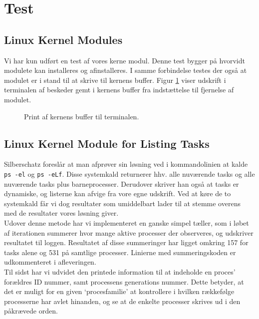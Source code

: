 \documentclass[main.tex]{subfile}
\begin{document}
\section{Test}
\subsection{Linux Kernel Modules}
Vi har kun udført en test af vores kerne modul. Denne test bygger på hvorvidt modulete kan installeres og afinstalleres. I samme forbindelse testes der også at modulet er i stand til at skrive til kernens buffer. Figur \ref{fig:part1_dmesg} viser udskrift i terminalen af beskeder gemt i kernens buffer fra indstættelse til fjernelse af modulet.
\begin{figure}[H]
\center
{}
\caption{Print af kernens buffer til terminalen.}
\label{fig:part1_dmesg}
\end{figure}

\subsection{Linux Kernel Module for Listing Tasks}
Silberschatz foreslår at man afprøver sin løsning ved i kommandolinien at kalde \texttt{ps -el} og \texttt{ps -eLf}. Disse systemkald returnerer hhv. alle nuværende tasks og alle nuværende tasks plus barneprocesser. Derudover skriver han også at tasks er dynamiske, og listerne kan afvige fra vore egne udskrift. Ved at køre de to systemkald får vi dog resultater som umiddelbart lader til at stemme overens med de resultater vores løsning giver.\\

Udover denne metode har vi implementeret en ganske simpel tæller, som i løbet af iterationen summerer hvor mange aktive processer der observeres, og udskriver resultatet til loggen. Resultatet af disse summeringer har ligget omkring 157 for tasks alene og 531 på samtlige processer. Linierne med summeringskoden er udkommenteret i afleveringen.\\

Til sidst har vi udvidet den printede information til at indeholde en proces’ forældres ID nummer, samt processens generations nummer. Dette betyder, at det er muligt for en given ‘procesfamilie’ at kontrollere i hvilken rækkefølge processerne har avlet hinanden, og se at de enkelte processer skrives ud i den påkrævede orden.
\end{document}
